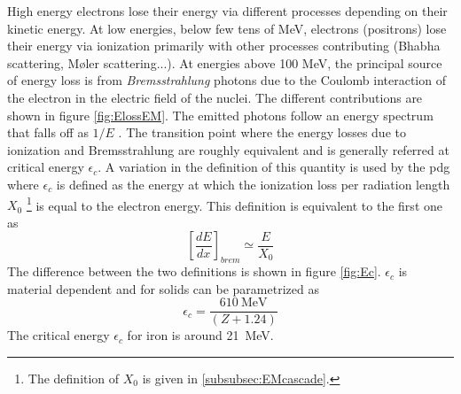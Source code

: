 High energy electrons lose their energy via different processes depending on their kinetic energy. At low energies, below few tens of MeV, electrons (positrons) lose their energy via ionization primarily with other processes contributing (Bhabha scattering, M\o{}ler scattering...). At energies above 100 MeV, the principal source of energy loss is from \textit{Brems\-strah\-lung} photons due to the Coulomb interaction of the electron in the electric field of the nuclei. The different contributions are shown in figure \ref{fig:ElossEM}. The emitted photons follow an energy spectrum that falls off as $1/E$ \cite{Wigmans:392793}. The transition point where the energy losses due to ionization and Bremsstrahlung are roughly equivalent and is generally referred at critical energy $\epsilon_{c}$. A variation in the definition of this quantity is used by the \acrshort{pdg} where $\epsilon_{c}$ is defined as the energy at which the ionization loss per radiation length $X_0$ \footnote{The definition of $X_0$ is given in \ref{subsubsec:EMcascade}.} is equal to the electron energy. This definition is equivalent to the first one as
\begin{equation}
  \left[\frac{dE}{dx}\right]_{brem} \simeq \frac{E}{X_0}
\end{equation}
The difference between the two definitions is shown in figure \ref{fig:Ec}. $\epsilon_{c}$ is material dependent and for solids can be parametrized as
\begin{equation}
  \epsilon_{c} = \frac{\SI{610}{\mega\eV}}{(Z + 1.24)}
\end{equation}
The critical energy $\epsilon_{c}$ for iron is around \SI{21}{\mega\eV}.

